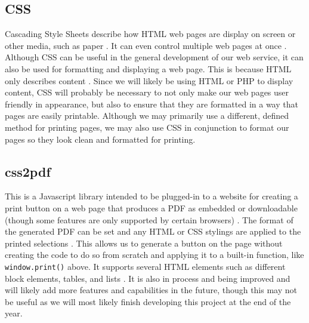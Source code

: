 \documentclass[letterpaper,10pt,serif, draftclsnofoot,onecolumn, compsoc, titlepage]{IEEEtran}
\begin{document}
\subsection{CSS} %
Cascading Style Sheets describe how HTML web pages are display on screen or other media, such as paper \cite{css}.
It can even control multiple web pages at once \cite{css}.
Although CSS can be useful in the general development of our web service, it can also be used for formatting and displaying a web page.
This is because HTML only describes content \cite{css}.
Since we will likely be using HTML or PHP to display content, CSS will probably be necessary to not only make our web pages user friendly in appearance, but also to ensure that they are formatted in a way that pages are easily printable.
Although we may primarily use a different, defined method for printing pages, we may also use CSS in conjunction to format our pages so they look clean and formatted for printing.
\subsection{css2pdf} %
This is a Javascript library intended to be plugged-in to a website for creating a print button on a web page that produces a PDF as embedded or downloadable (though some features are only supported by certain browsers) \cite{css2pdf}.
The format of the generated PDF can be set and any HTML or CSS stylings are applied to the printed selections \cite{css2pdf}.
This allows us to generate a button on the page without creating the code to do so from scratch and applying it to a built-in function, like \texttt{window.print()} above.
It supports several HTML elements such as different block elements, tables, and lists \cite{css2pdf_home}.
It is also in process and being improved and will likely add more features and capabilities in the future, though this may not be useful as we will most likely finish developing this project at the end of the year.
\end{document}
